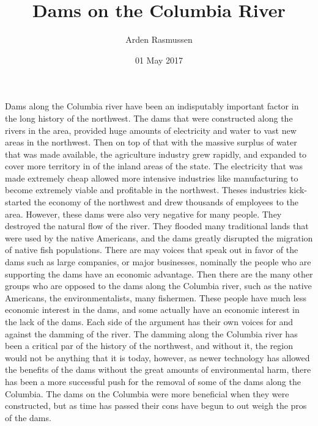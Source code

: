 \documentclass[12pt,twoside]{article}
\title{Dams on the Columbia River}
\author{Arden Rasmussen}
\date{01 May 2017}
\begin{document}
\maketitle
\newpage
{}
Dams along the Columbia river have been an indisputably important factor in the long history of the northwest. The dams that were constructed along the rivers in the area, provided huge amounts of electricity and water to vast new areas in the northwest. Then on top of that with the massive surplus of water that was made available, the agriculture industry grew rapidly, and expanded to cover more territory in of the inland areas of the state. The electricity that was made extremely cheap allowed more intensive industries like manufacturing to become extremely viable and profitable in the northwest. Theses industries kick-started the economy of the northwest and drew thousands of employees to the area. However, these dams were also very negative for many people. They destroyed the natural flow of the river. They flooded many traditional lands that were used by the native Americans, and the dams greatly disrupted the migration of native fish populations. There are may voices that speak out in favor of the dams such as large companies, or major businesses, nominally the people who are supporting the dams have an economic advantage. Then there are the many other groups who are opposed to the dams along the Columbia river, such as the native Americans, the environmentalists, many fishermen. These people have much less economic interest in the dams, and some actually have an economic interest in the lack of the dams. Each side of the argument has their own voices for and against the damming of the river. The damming along the Columbia river has been a critical par of the history of the northwest, and without it, the region would not be anything that it is today, however, as newer technology has allowed the benefits of the dams without the great amounts of environmental harm, there has been a more successful push for the removal of some of the dams along the Columbia. The dams on the Columbia were more beneficial when they were constructed, but as time has passed their cons have begun to out weigh the pros of the dams.
\par
\end{document}

